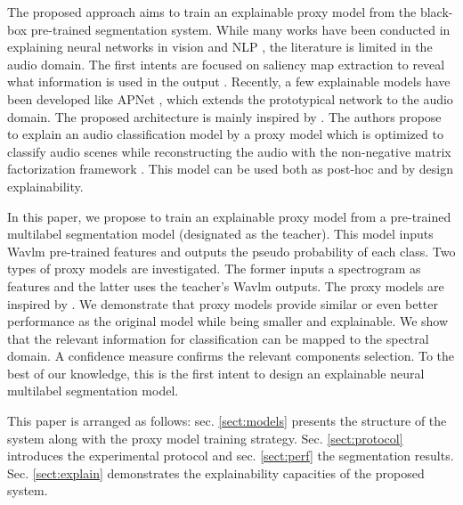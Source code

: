 The proposed approach aims to train an explainable proxy model from the black-box pre-trained segmentation system.
While many works have been conducted in explaining neural networks in vision \cite{ribeiro_why_2016} and NLP \cite{murphy_learning_2012}, the literature is limited in the audio domain.
The first intents are focused on saliency map extraction to reveal what information is used in the output \cite{ribeiro_why_2016,qi2019visualizing}.
Recently, a few explainable models have been developed like APNet \cite{zinemanas2021interpretable}, which extends the prototypical network to the audio domain.
The proposed architecture is mainly inspired by \cite{parekh2023tackling}.
The authors propose to explain an audio classification model by a proxy model which is optimized to classify audio scenes while reconstructing the audio with the non-negative matrix factorization framework \cite{lee2000algorithms}.
This model can be used both as post-hoc and by design explainability.

In this paper, we propose to train an explainable proxy model from a pre-trained multilabel segmentation model (designated as the teacher).
This model inputs Wavlm pre-trained features \cite{chen2022wavlm} and outputs the pseudo probability of each class.
Two types of proxy models are investigated.
The former inputs a spectrogram as features and the latter uses the teacher's Wavlm outputs.
The proxy models are inspired by \cite{parekh2023tackling}.
We demonstrate that proxy models provide similar or even better performance as the original model while being smaller and explainable.
We show that the relevant information for classification can be mapped to the spectral domain.
A confidence measure confirms the relevant components selection.
To the best of our knowledge, this is the first intent to design an explainable neural multilabel segmentation model.  

This paper is arranged as follows: sec. \ref{sect:models} presents the structure of the system along with the proxy model training strategy.
Sec. \ref{sect:protocol} introduces the experimental protocol and sec. \ref{sect:perf} the segmentation results. 
Sec. \ref{sect:explain} demonstrates the explainability capacities of the proposed system.









